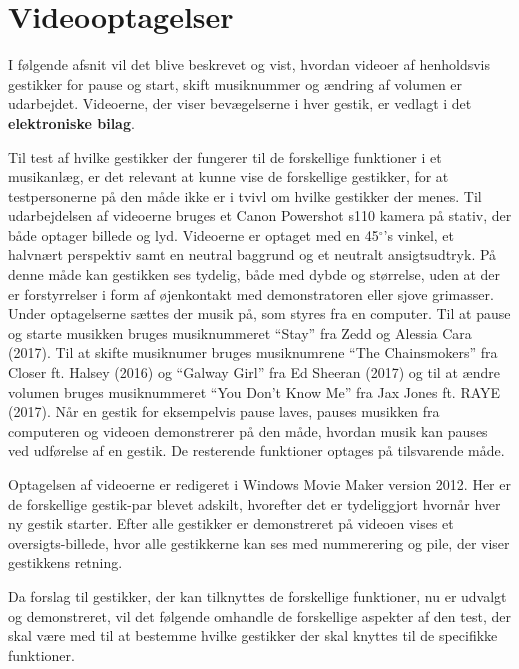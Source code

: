 \section{Videooptagelser}
\label{VideooptagelserValgAfGestikker}
%
I følgende afsnit vil det blive beskrevet og vist, hvordan videoer af henholdsvis gestikker for pause og start, skift musiknummer og ændring af volumen er udarbejdet. Videoerne, der viser bevægelserne i hver gestik, er vedlagt i det \textbf{elektroniske bilag}.

Til test af hvilke gestikker der fungerer til de forskellige funktioner i et musikanlæg, er det relevant at kunne vise de forskellige gestikker, for at testpersonerne på den måde ikke er i tvivl om hvilke gestikker der menes. Til udarbejdelsen af videoerne bruges et Canon Powershot s110 kamera på stativ, der både optager billede og lyd. Videoerne er optaget med en 45$^{\circ}$'s vinkel, et halvnært perspektiv samt en neutral baggrund og et neutralt ansigtsudtryk. På denne måde kan gestikken ses tydelig, både med dybde og størrelse, uden at der er forstyrrelser i form af øjenkontakt med demonstratoren eller sjove grimasser. Under optagelserne sættes der musik på, som styres fra en computer. Til at pause og starte musikken bruges musiknummeret \enquote{Stay} fra Zedd og Alessia Cara (2017). Til at skifte musiknumer bruges musiknumrene \enquote{The Chainsmokers} fra Closer ft. Halsey (2016) og \enquote{Galway Girl} fra Ed Sheeran (2017) og til at ændre volumen bruges musiknummeret \enquote{You Don't Know Me} fra Jax Jones ft. RAYE (2017). Når en gestik for eksempelvis pause laves, pauses musikken fra computeren og videoen demonstrerer på den måde, hvordan musik kan pauses ved udførelse af en gestik. De resterende funktioner optages på tilsvarende måde.

Optagelsen af videoerne er redigeret i Windows Movie Maker version 2012. Her er de forskellige gestik-par blevet adskilt, hvorefter det er tydeliggjort hvornår hver ny gestik starter. Efter alle gestikker er demonstreret på videoen vises et oversigts-billede, hvor alle gestikkerne kan ses med nummerering og pile, der viser gestikkens retning. 

Da forslag til gestikker, der kan tilknyttes de forskellige funktioner, nu er udvalgt og demonstreret, vil det følgende omhandle de forskellige aspekter af den test, der skal være med til at bestemme hvilke gestikker der skal knyttes til de specifikke funktioner.